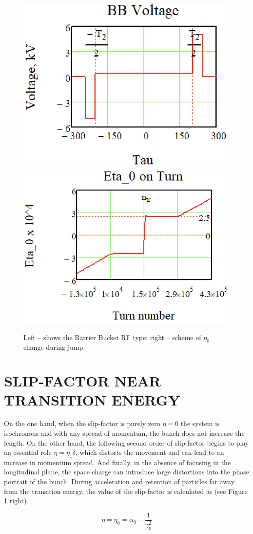 \documentclass[a4paper]{jpconf}
\begin{document}
\begin{figure}[!htb]
   \centering
   \includegraphics*[width=.484\columnwidth]{img/WEPOPT004_f3-1}
   \includegraphics*[width=.505\columnwidth]{img/WEPOPT004_f3-2}
   \caption{Left – shows the Barrier Bucket RF type; right – scheme of $\eta_{0}$ change during jump.}
   \label{fig:BB_w_eta_0}
\end{figure}

\section{SLIP-FACTOR NEAR TRANSITION ENERGY}

\par On the one hand, when the slip-factor is purely zero $\eta=0$ the system is isochronous and with any spread of momentum, the bunch does not increase the length. On the other hand, the following second order of slip-factor begins to play an essential role $\eta=\eta_{1}\delta$, which distorts the movement and can lead to an increase in momentum spread. And finally, in the absence of focusing in the longitudinal plane, the space charge can introduce large distortions into the phase portrait of the bunch.
During acceleration and retention of particles far away from the transition energy, the value of the slip-factor is calculated as (see Figure \ref{fig:BB_w_eta_0} right)

\begin{equation}\label{eq:eta_0}
\eta=\eta_{0}=\alpha_{0}-\frac{1}{\gamma_{0}^{2}}
\end{equation}
\end{document}
